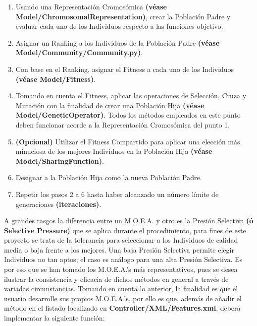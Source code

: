 \documentclass[class=report, crop=false]{standalone}
\begin{document}
\begin{enumerate} 
\item Usando una Representación Cromosómica \textbf{(véase Model/ChromosomalRepresentation)}, crear la Población Padre y evaluar cada uno de los Individuos respecto a las funciones objetivo.
\item Asignar un Ranking a los Individuos de la Población Padre \textbf{(véase Model/}\break\textbf{Community/Community.py)}.
\item Con base en el Ranking, asignar el Fitness a cada uno de los Individuos \textbf{(véase Model/Fitness)}.
\item Tomando en cuenta el Fitness, aplicar las operaciones de Selección, Cruza y Mutación con la finalidad de crear una Población Hija \textbf{(véase Model/GeneticOperator)}. Todos los métodos empleados en este punto deben funcionar acorde a la Representación Cromosómica del punto 1.
\item \textbf{(Opcional)} Utilizar el Fitness Compartido para aplicar una elección más minuciosa de los mejores Individuos en la Población Hija \textbf{(véase Model/SharingFunction)}.
\item Designar a la Población Hija como la nueva Población Padre.
\item Repetir los pasos 2 a 6 hasta haber alcanzado un número límite de generaciones \textbf{(iteraciones)}.
\end{enumerate}

A grandes rasgos la diferencia entre un M.O.E.A. y otro es la Presión 
Selectiva \textbf{(ó Selective Pressure)} que se aplica durante 
el procedimiento, para fines de este proyecto se trata de la 
tolerancia para seleccionar a los Individuos de calidad media o 
baja frente a los mejores.\break 
Una baja Presión Selectiva permite elegir Individuos no tan 
aptos; el caso es análogo para una alta Presión Selectiva.\medskip\break
Es por eso que se han tomado los M.O.E.A.'s más representativos, 
pues se desea ilustrar la consistencia y eficacia de dichos métodos 
en general a través de variadas circunstancias.\break
Tomando en cuenta lo anterior, la finalidad es que el usuario desarrolle
sus propios M.O.E.A.'s, por ello es que, además de añadir el método 
en el listado localizado en \textbf{Controller/}\break\textbf{XML/Features.xml}, deberá 
implementar la siguiente función:
\end{document}
